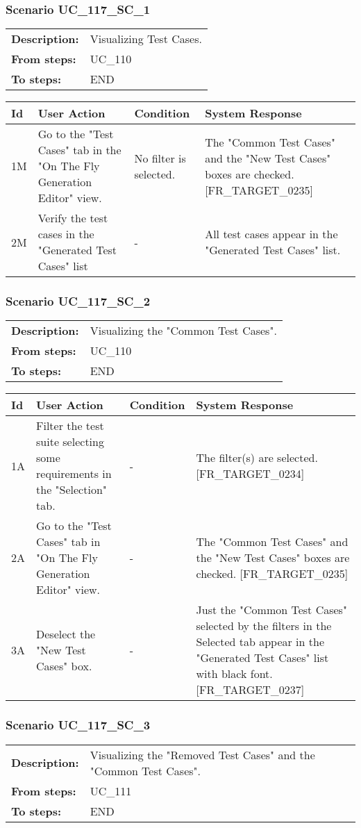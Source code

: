 \documentclass[a4paper,11pt]{article}
\newcommand{\bl}{\\ \hline}
\begin{document}
\subsubsection*{Scenario UC_117_SC_1}
\begin{tabular}{p{1in}p{4in}}
{\bf Description:} & Visualizing Test Cases. \\
{\bf From steps:} & UC_110#2M \\
{\bf To steps:} & END \\
\end{tabular}
 
\begin{tabular}{|p{0.8in}|p{1.6in}|p{1.6in}|p{1.6in}|}
\hline
Id & User Action & Condition & System Response  \bl 
1M & Go to the "Test Cases" tab in the "On The Fly Generation Editor" view. & No filter is selected. & The "Common Test Cases" and the "New Test Cases" boxes are checked. [FR_TARGET_0235] \bl 
2M & Verify the test cases in the "Generated Test Cases" list & - & All test cases appear in the "Generated Test Cases" list. \bl 
\end{tabular}
\subsubsection*{Scenario UC_117_SC_2}
\begin{tabular}{p{1in}p{4in}}
{\bf Description:} & Visualizing the "Common Test Cases". \\
{\bf From steps:} & UC_110#2M \\
{\bf To steps:} & END \\
\end{tabular}
 
\begin{tabular}{|p{0.8in}|p{1.6in}|p{1.6in}|p{1.6in}|}
\hline
Id & User Action & Condition & System Response  \bl 
1A & Filter the test suite selecting some requirements in the "Selection" tab. & - & The filter(s) are selected. [FR_TARGET_0234] \bl 
2A & Go to the "Test Cases" tab in "On The Fly Generation Editor" view. & - & The "Common Test Cases" and the "New Test Cases" boxes are checked. [FR_TARGET_0235] \bl 
3A & Deselect the "New Test Cases" box. & - & Just the "Common Test Cases" selected by the filters in the Selected tab appear in the "Generated Test Cases" list with black font. [FR_TARGET_0237] \bl 
\end{tabular}
\subsubsection*{Scenario UC_117_SC_3}
\begin{tabular}{p{1in}p{4in}}
{\bf Description:} & Visualizing the "Removed Test Cases" and the "Common Test Cases". \\
{\bf From steps:} & UC_111#2M \\
{\bf To steps:} & END \\
\end{tabular}
 
\end{document}
